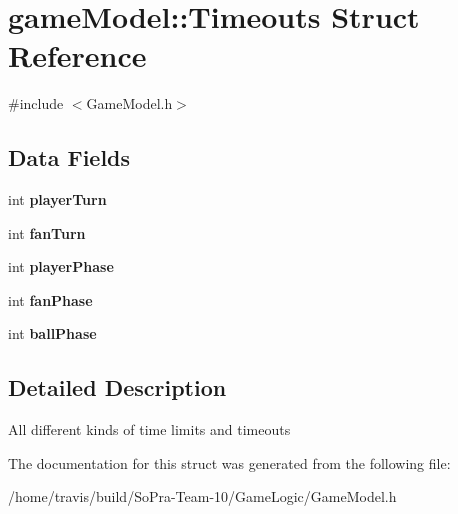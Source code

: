 \hypertarget{structgame_model_1_1_timeouts}{\section{game\-Model\-:\-:Timeouts Struct Reference}
\label{structgame_model_1_1_timeouts}
}


{\ttfamily \#include $<$Game\-Model.\-h$>$}

\subsection*{Data Fields}
\begin{DoxyCompactItemize}
\item 
\hypertarget{structgame_model_1_1_timeouts_aa98e3131cb2b9c69a16fcac3fb34ce9e}{int {\bfseries player\-Turn}}\label{structgame_model_1_1_timeouts_aa98e3131cb2b9c69a16fcac3fb34ce9e}

\item 
\hypertarget{structgame_model_1_1_timeouts_a1645cb3220ee94d55ec2ceba7a34054c}{int {\bfseries fan\-Turn}}\label{structgame_model_1_1_timeouts_a1645cb3220ee94d55ec2ceba7a34054c}

\item 
\hypertarget{structgame_model_1_1_timeouts_a4b09c9deeb9c584b0d36a4ec79f18ba4}{int {\bfseries player\-Phase}}\label{structgame_model_1_1_timeouts_a4b09c9deeb9c584b0d36a4ec79f18ba4}

\item 
\hypertarget{structgame_model_1_1_timeouts_a00fe919f0c92bb2e96807b8aea6cf308}{int {\bfseries fan\-Phase}}\label{structgame_model_1_1_timeouts_a00fe919f0c92bb2e96807b8aea6cf308}

\item 
\hypertarget{structgame_model_1_1_timeouts_a38e03ad300283aaad1ea1f4d3d6fb646}{int {\bfseries ball\-Phase}}\label{structgame_model_1_1_timeouts_a38e03ad300283aaad1ea1f4d3d6fb646}

\end{DoxyCompactItemize}


\subsection{Detailed Description}
All different kinds of time limits and timeouts 

The documentation for this struct was generated from the following file\-:\begin{DoxyCompactItemize}
\item 
/home/travis/build/\-So\-Pra-\/\-Team-\/10/\-Game\-Logic/Game\-Model.\-h\end{DoxyCompactItemize}
